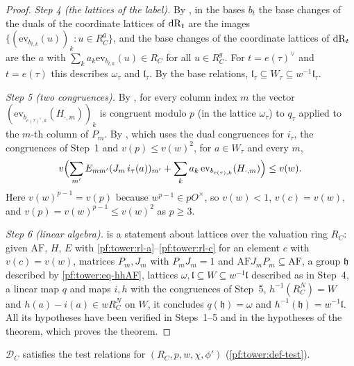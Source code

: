 \begin{proof}
\emph{Step 4 (the lattices of the label).} By , in the bases $b_t$ the
base changes of the duals of the coordinate lattices of $\mathrm{dR}_t$ are the images $\{(\mathrm{ev}_{b_{t,k}}(u))_k:u\in R_C^g\}$,
and the base changes of the coordinate lattices of $\mathrm{dR}_t$ are the $a$ with $\sum_ka_k\mathrm{ev}_{b_{t,k}}(u)\in R_C$ for all
$u\in R_C^g$. For $t=e(\tau)^\vee$ and $t=e(\tau)$ this describes $\omega_\tau$ and $\mathfrak l_\tau$. By the base relations,
$\mathfrak l_\tau\subseteq W_\tau\subseteq w^{-1}\mathfrak l_\tau$.

\emph{Step 5 (two congruences).} By , for every column index $m$ the
vector $(\mathrm{ev}_{b_{e(\tau)^\vee,k}}(H_{\cdot,m}))_k$ is congruent modulo $p$ (in the lattice $\omega_\tau$) to
$q_\tau$ applied to the $m$-th column of $P_m$. By , which uses the
dual congruences for $i_\tau$, the congruences of Step~1 and $v(p)\le v(w)^2$, for $a\in W_\tau$ and every $m$,
\[
v\Bigl(\sum_{m'}E_{mm'}(J_m\,i_\tau(a))_{m'}+\sum_ka_k\,\mathrm{ev}_{b_{e(\tau),k}}(H_{\cdot,m})\Bigr)\le v(w).
\]
Here $v(w)^{p-1}=v(p)$ because $w^{p-1}\in pO^\times$, so $v(w)<1$, $v(c)=v(w)$, and $v(p)=v(w)^{p-1}\le v(w)^2$ as $p\ge3$.

\emph{Step 6 (linear algebra).}  is a statement about lattices over the
valuation ring $R_C$: given $\mathrm{AF}$, $H$, $E$ with \ref{pf:tower:rl-a}--\ref{pf:tower:rl-c} for an element $c$ with
$v(c)=v(w)$, matrices $P_m,J_m$ with $P_mJ_m=1$ and $\mathrm{AF}J_mP_m\subseteq\mathrm{AF}$, a group $\mathfrak h$ described
by \eqref{pf:tower:eq-hhAF}, lattices $\omega,\mathfrak l\subseteq W\subseteq w^{-1}\mathfrak l$ described as in Step~4, a linear
map $q$ and maps $i,h$ with the congruences of Step~5, $h^{-1}(R_C^N)=W$ and $h(a)-i(a)\in wR_C^N$ on $W$, it concludes
$q(\mathfrak h)=\omega$ and $h^{-1}(\mathfrak h)=w^{-1}\mathfrak l$. All its hypotheses have been verified in Steps~1--5 and
in the hypotheses of the theorem, which proves the theorem.
\end{proof}

\begin{theorem}\label{pf:tower:testpt}
$\mathcal D_C$ satisfies the test relations for $(R_C,p,w,\chi,\phi')$ (\cref{pf:tower:def-test}).
\end{theorem}

